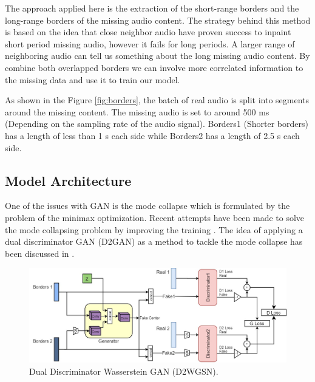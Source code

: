 \documentclass{article} %
\begin{document}
The approach applied here is the extraction of the short-range borders and the long-range borders of the missing audio content. The strategy behind this method is based on the idea that close neighbor audio have proven success to inpaint short period missing audio, however it fails for long periods. A larger range of neighboring audio can tell us something about the long missing audio content. By combine both overlapped borders we can involve more correlated information to the missing data and use it to train our model.


As shown in the Figure \ref{fig:borders}, the batch of real audio is split into segments around the missing content. The missing audio is set to around 500 ms (Depending on the sampling rate of the audio signal). Borders1 (Shorter borders) has a length of less than 1 s each side while Borders2 has a length of 2.5 s each side.


\subsection{Model Architecture}
One of the issues with GAN is the mode collapse which is formulated by the problem of the minimax optimization. Recent attempts have been made to solve the mode collapsing problem by improving the training \cite{Hoang2017MultiGenerator}. The idea of applying a dual discriminator GAN (D2GAN) as a method to tackle the mode collapse has been discussed in \cite{nguyen2017dual}.

\begin{figure}[h]
    \includegraphics[scale=0.36]{images/model_extend2.jpg}
    \centering
    \caption{Dual Discriminator Wasserstein GAN (D2WGSN).}
    \label{fig:extendedmodel}
\end{figure}
\end{document}
